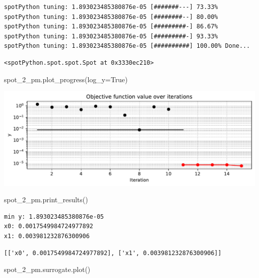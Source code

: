 \documentclass[
  letterpaper,
  DIV=11,
  numbers=noendperiod]{scrreprt}
\newenvironment{Shaded}{\begin{snugshade}}{\end{snugshade}}
\newcommand{\NormalTok}[1]{\textcolor[rgb]{0.00,0.23,0.31}{#1}}
\newcommand{\OperatorTok}[1]{\textcolor[rgb]{0.37,0.37,0.37}{#1}}
\newcommand{\VariableTok}[1]{\textcolor[rgb]{0.07,0.07,0.07}{#1}}
\begin{document}
\begin{verbatim}
spotPython tuning: 1.893023485380876e-05 [#######---] 73.33% 
spotPython tuning: 1.893023485380876e-05 [########--] 80.00% 
spotPython tuning: 1.893023485380876e-05 [#########-] 86.67% 
spotPython tuning: 1.893023485380876e-05 [#########-] 93.33% 
spotPython tuning: 1.893023485380876e-05 [##########] 100.00% Done...
\end{verbatim}

\begin{verbatim}
<spotPython.spot.spot.Spot at 0x3330ec210>
\end{verbatim}

\begin{Shaded}
\begin{Highlighting}[]
\NormalTok{spot\_2\_pm.plot\_progress(log\_y}\OperatorTok{=}\VariableTok{True}\NormalTok{)}
\end{Highlighting}
\end{Shaded}

\includegraphics{015_num_spot_correlation_p_files/figure-pdf/cell-16-output-1.pdf}

\begin{Shaded}
\begin{Highlighting}[]
\NormalTok{spot\_2\_pm.print\_results()}
\end{Highlighting}
\end{Shaded}

\begin{verbatim}
min y: 1.893023485380876e-05
x0: 0.0017549984724977892
x1: 0.003981232876300906
\end{verbatim}

\begin{verbatim}
[['x0', 0.0017549984724977892], ['x1', 0.003981232876300906]]
\end{verbatim}

\begin{Shaded}
\begin{Highlighting}[]
\NormalTok{spot\_2\_pm.surrogate.plot()}
\end{Highlighting}
\end{Shaded}
\end{document}
